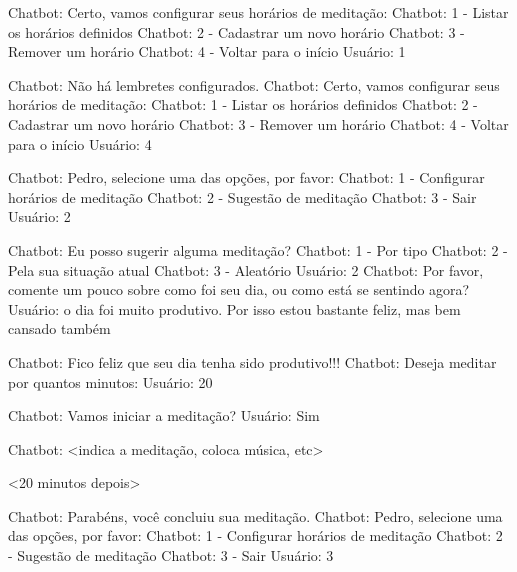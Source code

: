 Chatbot: Certo, vamos configurar seus horários de meditação:
Chatbot: 1 - Listar os horários definidos
Chatbot: 2 - Cadastrar um novo horário
Chatbot: 3 - Remover um horário
Chatbot: 4 - Voltar para o início
Usuário: 1

Chatbot: Não há lembretes configurados.
Chatbot: Certo, vamos configurar seus horários de meditação:
Chatbot: 1 - Listar os horários definidos
Chatbot: 2 - Cadastrar um novo horário
Chatbot: 3 - Remover um horário
Chatbot: 4 - Voltar para o início
Usuário: 4

Chatbot: Pedro, selecione uma das opções, por favor:
Chatbot: 1 - Configurar horários de meditação
Chatbot: 2 - Sugestão de meditação
Chatbot: 3 - Sair 
Usuário: 2

Chatbot: Eu posso sugerir alguma meditação?
Chatbot: 1 - Por tipo
Chatbot: 2 - Pela sua situação atual
Chatbot: 3 - Aleatório
Usuário: 2
Chatbot: Por favor, comente um pouco sobre como foi seu dia, ou como está se sentindo agora?
Usuário: o dia foi muito produtivo. Por isso estou bastante feliz, mas bem cansado também

Chatbot: Fico feliz que seu dia tenha sido produtivo!!!
Chatbot: Deseja meditar por quantos minutos:
Usuário: 20

Chatbot: Vamos iniciar a meditação?
Usuário: Sim

Chatbot: <indica a meditação, coloca música, etc>

<20 minutos depois>

Chatbot: Parabéns, você concluiu sua meditação.
Chatbot: Pedro, selecione uma das opções, por favor:
Chatbot: 1 - Configurar horários de meditação
Chatbot: 2 - Sugestão de meditação
Chatbot: 3 - Sair 
Usuário: 3

